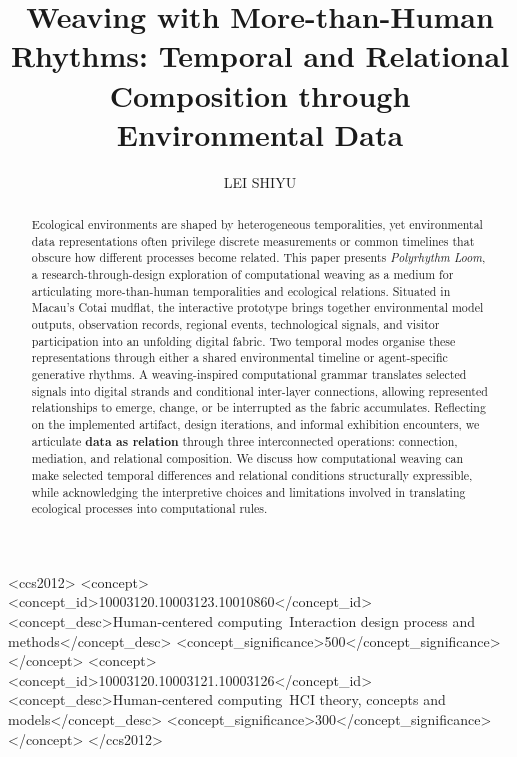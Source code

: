 \documentclass[manuscript,review,anonymous]{acmart}
\begin{document}
\title{Weaving with More-than-Human Rhythms: Temporal and Relational Composition through Environmental Data}

\author{LEI SHIYU}
\renewcommand{\shortauthors}{Anonymous Author(s)}

\begin{abstract}
Ecological environments are shaped by heterogeneous temporalities, yet environmental data representations often privilege discrete measurements or common timelines that obscure how different processes become related. This paper presents \emph{Polyrhythm Loom}, a research-through-design exploration of computational weaving as a medium for articulating more-than-human temporalities and ecological relations. Situated in Macau's Cotai mudflat, the interactive prototype brings together environmental model outputs, observation records, regional events, technological signals, and visitor participation into an unfolding digital fabric. Two temporal modes organise these representations through either a shared environmental timeline or agent-specific generative rhythms. A weaving-inspired computational grammar translates selected signals into digital strands and conditional inter-layer connections, allowing represented relationships to emerge, change, or be interrupted as the fabric accumulates. Reflecting on the implemented artifact, design iterations, and informal exhibition encounters, we articulate \textbf{data as relation} through three interconnected operations: connection, mediation, and relational composition. We discuss how computational weaving can make selected temporal differences and relational conditions structurally expressible, while acknowledging the interpretive choices and limitations involved in translating ecological processes into computational rules.
\end{abstract}

\begin{CCSXML}
<ccs2012>
<concept>
<concept_id>10003120.10003123.10010860</concept_id>
<concept_desc>Human-centered computing~Interaction design process and methods</concept_desc>
<concept_significance>500</concept_significance>
</concept>
<concept>
<concept_id>10003120.10003121.10003126</concept_id>
<concept_desc>Human-centered computing~HCI theory, concepts and models</concept_desc>
<concept_significance>300</concept_significance>
</concept>
</ccs2012>
\end{CCSXML}
\end{document}

